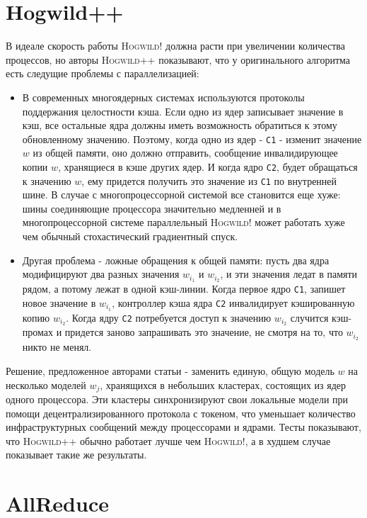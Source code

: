 \documentclass[12pt]{report}
\begin{document}
  \section{Hogwild++}
  В идеале скорость работы \textsc{Hogwild!} должна расти при увеличении количества
  процессов, но авторы \textsc{Hogwild++} показывают, что у оригинального алгоритма
  есть следущие проблемы с параллелизацией:
  \begin{itemize}
    \item
    В современных многоядерных системах используются протоколы поддержания
    целостности кэша. Если одно из ядер записывает значение в кэш, все остальные ядра
    должны иметь возможность обратиться к этому обновленному значению. Поэтому,
    когда одно из ядер - \verb|C1| - изменит значение $w$ из общей памяти, оно должно отправить,
    сообщение инвалидирующее копии $w$, хранящиеся в кэше других ядер. И когда ядро \verb|C2|,
    будет обращаться к значению $w$, ему придется получить это значение из \verb|C1| по
    внутренней шине. В случае с многопроцессорной системой все становится еще хуже:
    шины соединяющие процессора значительно медленней и в многопроцессорной системе
    параллельный \textsc{Hogwild!} может работать хуже чем обычный стохастический
    градиентный спуск.
    \item
    Другая проблема - ложные обращения к общей памяти: пусть два ядра модифицируют
    два разных значения $w_{i_1}$ и $w_{i_2}$, и эти значения ледат в памяти рядом,
    а потому лежат в одной кэш-линии. Когда первое ядро \verb|C1|, запишет новое значение
    в $w_{i_1}$, контроллер кэша ядра \verb|C2| инвалидирует кэшированную копию $w_{i_2}$.
    Когда ядру \verb|C2| потребуется доступ к значению $w_{i_2}$ случится кэш-промах
    и придется заново запрашивать это значение, не смотря на то, что $w_{i_2}$ никто
    не менял.
  \end{itemize}
  Решение, предложенное авторами статьи - заменить единую, общую модель $w$ на
  несколько моделей $w_j$, хранящихся в небольших кластерах, состоящих из ядер
  одного процессора. Эти кластеры синхронизируют свои локальные модели при помощи
  децентрализированного протокола с токеном, что уменьшает количество инфраструктурных
  сообщений между процессорами и ядрами. Тесты показывают, что \textsc{Hogwild++}
  обычно работает лучше чем \textsc{Hogwild!}, а в худшем случае показывает такие
  же результаты.
  \section{AllReduce}
\end{document}
